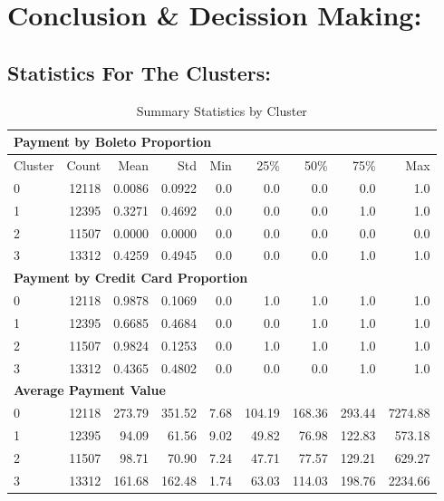 \documentclass[a4paper,12pt]{article}
\begin{document}

\section{Conclusion \& Decission Making:}

\subsection*{Statistics For The Clusters:}

\begin{longtable}{lrrrrrrrr}
\caption{Summary Statistics by Cluster} \\
\toprule
\multicolumn{9}{l}{\textbf{Payment by Boleto Proportion}} \\
\midrule
Cluster & Count & Mean & Std & Min & 25\% & 50\% & 75\% & Max \\
\midrule
0 & 12118 & 0.0086 & 0.0922 & 0.0 & 0.0 & 0.0 & 0.0 & 1.0 \\
1 & 12395 & 0.3271 & 0.4692 & 0.0 & 0.0 & 0.0 & 1.0 & 1.0 \\
2 & 11507 & 0.0000 & 0.0000 & 0.0 & 0.0 & 0.0 & 0.0 & 0.0 \\
3 & 13312 & 0.4259 & 0.4945 & 0.0 & 0.0 & 0.0 & 1.0 & 1.0 \\
\midrule
\multicolumn{9}{l}{\textbf{Payment by Credit Card Proportion}} \\
\midrule
0 & 12118 & 0.9878 & 0.1069 & 0.0 & 1.0 & 1.0 & 1.0 & 1.0 \\
1 & 12395 & 0.6685 & 0.4684 & 0.0 & 0.0 & 1.0 & 1.0 & 1.0 \\
2 & 11507 & 0.9824 & 0.1253 & 0.0 & 1.0 & 1.0 & 1.0 & 1.0 \\
3 & 13312 & 0.4365 & 0.4802 & 0.0 & 0.0 & 0.0 & 1.0 & 1.0 \\
\midrule
\multicolumn{9}{l}{\textbf{Average Payment Value}} \\
\midrule
0 & 12118 & 273.79 & 351.52 & 7.68 & 104.19 & 168.36 & 293.44 & 7274.88 \\
1 & 12395 & 94.09 & 61.56 & 9.02 & 49.82 & 76.98 & 122.83 & 573.18 \\
2 & 11507 & 98.71 & 70.90 & 7.24 & 47.71 & 77.57 & 129.21 & 629.27 \\
3 & 13312 & 161.68 & 162.48 & 1.74 & 63.03 & 114.03 & 198.76 & 2234.66 \\

\end{longtable}
\end{document}
